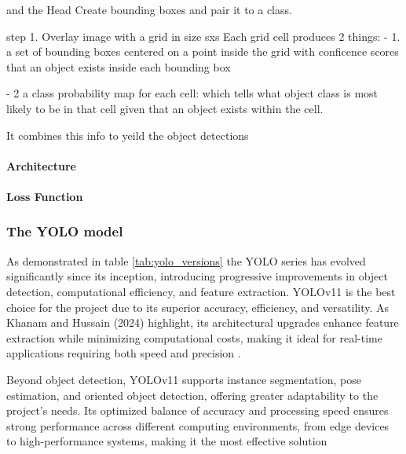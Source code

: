 \documentclass[a4paper,10pt,twocolumn]{article}
\numberwithin{figure}{section}
\numberwithin{table}{section}
\begin{document}
and the Head 
Create bounding boxes and pair it to a class.

step 1. Overlay image with a grid in size sxs 
Each grid cell produces 2 things:
- 1. a set of bounding boxes centered on a point inside the grid
 with conficence scores that an object exists inside each bounding box 

 - 2 a class probability map for each cell: which tells what object class is most 
 likely to be in that cell given that an object exists within the cell.

It combines this info to yeild the object detections 

\paragraph{Architecture}


\paragraph{Loss Function}


\subsubsection{The YOLO model}
\vspace{0.3cm}
As demonstrated in table \ref{tab:yolo_versions} the YOLO series has
 evolved significantly since its inception, introducing progressive improvements
  in object detection, computational efficiency, and feature extraction. 
YOLOv11 is the best choice for the project due to its superior accuracy, 
efficiency, and versatility. As Khanam and Hussain (2024) highlight, 
its architectural upgrades enhance feature extraction while minimizing 
computational costs, making it ideal for real-time applications requiring 
both speed and precision \citep{khanam2024yolov11overviewkeyarchitectural}.

\vspace{0.3cm}
Beyond object detection, YOLOv11 supports instance segmentation, 
pose estimation, and oriented object detection, offering greater adaptability 
to the project’s needs. Its optimized balance of accuracy and processing speed 
ensures strong performance across different computing environments, from edge 
devices to high-performance systems, making it the most effective solution
\end{document}
